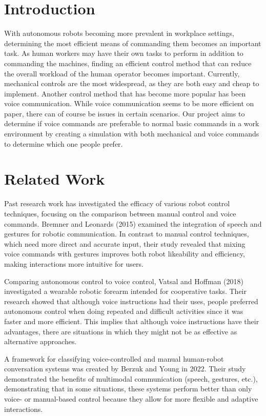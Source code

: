 \documentclass[conference]{IEEEtran}
\begin{document}
\section{Introduction}
With autonomous robots becoming more prevalent in workplace settings, determining the most efficient means of commanding them becomes an important task. As human workers may have their own tasks to perform in addition to commanding the machines, finding an efficient control method that can reduce the overall workload of the human operator becomes important. Currently, mechanical controls are the most widespread, as they are both easy and cheap to implement. Another control method that has become more popular has been voice communication. While voice communication seems to be more efficient on paper, there can of course be issues in certain scenarios. Our project aims to determine if voice commands are preferable to normal basic commands in a work environment by creating a simulation with both mechanical and voice commands to determine which one people prefer.  

\section{Related Work}
Past research work has investigated the efficacy of various robot control techniques, focusing on the comparison between manual control and voice commands. Bremner and Leonards (2015) examined the integration of speech and gestures for robotic communication. In contrast to manual control techniques, which need more direct and accurate input, their study revealed that mixing voice commands with gestures improves both robot likeability and efficiency, making interactions more intuitive for users. 

Comparing autonomous control to voice control, Vatsal and Hoffman (2018) investigated a wearable robotic forearm intended for cooperative tasks. Their research showed that although voice instructions had their uses, people preferred autonomous control when doing repeated and difficult activities since it was faster and more efficient. This implies that although voice instructions have their advantages, there are situations in which they might not be as effective as alternative approaches. 

A framework for classifying voice-controlled and manual human-robot conversation systems was created by Berzuk and Young in 2022. Their study demonstrated the benefits of multimodal communication (speech, gestures, etc.), demonstrating that in some situations, these systems perform better than only voice- or manual-based control because they allow for more flexible and adaptive interactions. 
\end{document}
